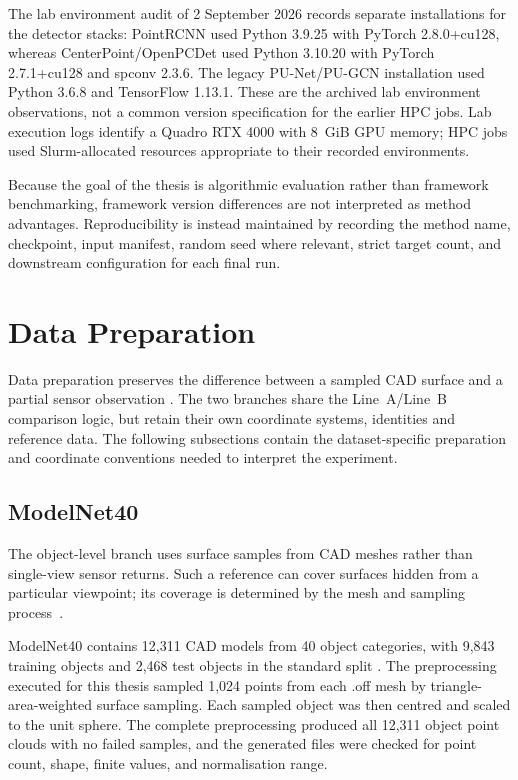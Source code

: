 The lab environment audit of 2 September 2026 records separate
installations for the detector stacks: PointRCNN used Python 3.9.25
with PyTorch 2.8.0+cu128, whereas CenterPoint/OpenPCDet used Python
3.10.20 with PyTorch 2.7.1+cu128 and spconv 2.3.6. The legacy
PU-Net/PU-GCN installation used Python 3.6.8 and TensorFlow 1.13.1.
These are the archived lab environment observations, not a common
version specification for the earlier HPC jobs. Lab execution logs
identify a Quadro RTX 4000 with 8~GiB GPU memory; HPC jobs used
Slurm-allocated resources appropriate to their recorded environments.

Because the goal of the thesis is algorithmic evaluation rather than framework benchmarking, framework version differences are not interpreted as method advantages. Reproducibility is instead maintained by recording the method name, checkpoint, input manifest, random seed where relevant, strict target count, and downstream configuration for each final run.



\section{Data Preparation}
\label{sec:fc-4-3}

Data preparation preserves the difference between a sampled CAD surface
and a partial sensor observation
\cite{wu2015modelnet,geiger2013kitti}. The two branches share the
Line~A/Line~B comparison logic, but retain their own coordinate
systems, identities and reference data. The following subsections
contain the dataset-specific preparation and coordinate conventions
needed to interpret the experiment.

\subsection{ModelNet40}
\label{sec:fc-4-3-1}
\label{subsec:object_samples}

The object-level branch uses surface samples from CAD meshes rather than
single-view sensor returns. Such a reference can cover surfaces hidden
from a particular viewpoint; its coverage is determined by the mesh and
sampling process~\cite{wu2015modelnet,qi2017pointnet}.

ModelNet40 contains 12,311 CAD models from 40 object categories, with 9,843 training objects and 2,468 test objects in the standard split \cite{wu2015modelnet}. The preprocessing executed for this thesis sampled 1,024 points from each .off mesh by triangle-area-weighted surface sampling. Each sampled object was then centred and scaled to the unit sphere. The complete preprocessing produced all 12,311 object point clouds with no failed samples, and the generated files were checked for point count, shape, finite values, and normalisation range.

